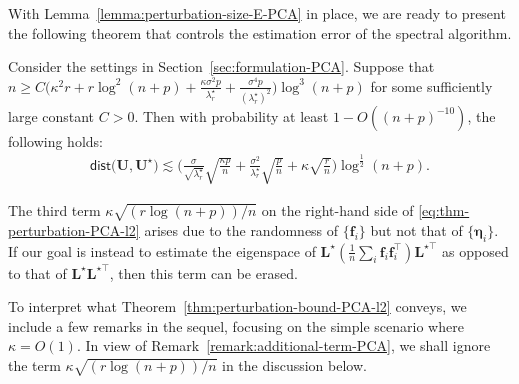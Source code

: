 With Lemma~\ref{lemma:perturbation-size-E-PCA} in place, we are ready to present the following theorem that controls the estimation error of the spectral algorithm.
%
\begin{theorem}
\label{thm:perturbation-bound-PCA-l2}
%
Consider the settings in Section~\ref{sec:formulation-PCA}.
Suppose that $n \geq C \big(\kappa^{2}r+ r\log^2(n+p)+ \frac{\kappa\sigma^{2}p}{\lambda_{r}^{\star}}+\frac{\sigma^{4}p}{(\lambda_{r}^{\star})^{2}}\big)\log^{3} (n+p)$ for some sufficiently large constant $C>0$.
Then with probability  at least $1-O((n+p)^{-10})$, the following holds:
%
\begin{align}
\mathsf{dist}\big(\bm{U},\bm{U}^{\star}\big)
	\lesssim\Bigg(\frac{\sigma}{\sqrt{\lambda_{r}^{\star}}}\sqrt{\frac{\kappa p}{n}}+\frac{\sigma^{2}}{\lambda_{r}^{\star}}\sqrt{\frac{p}{n}} + \kappa\sqrt{\frac{r}{n}}\Bigg)\log^{\frac{1}{2}}(n+p).
\label{eq:thm-perturbation-PCA-l2}
\end{align}
%
\end{theorem}
%
\begin{remark}
	\label{remark:additional-term-PCA}
	The third term $\kappa\sqrt{(r \log(n+p)) /n} $ on the right-hand side of \eqref{eq:thm-perturbation-PCA-l2} arises due to the randomness of $\{\bm{f}_i\}$ but not that of $\{\bm{\eta}_i\}$. If our goal is instead to estimate the eigenspace of $\bm{L}^{\star} (\frac{1}{n}\sum_i\bm{f}_i\bm{f}_i^{\top})\bm{L}^{\star\top}$ as opposed to that of $\bm{L}^{\star}\bm{L}^{\star\top}$, then this term can be erased.
\end{remark}
 


To interpret what Theorem~\ref{thm:perturbation-bound-PCA-l2} conveys,
we include a few remarks in the sequel, focusing on the simple scenario where $\kappa =O(1)$.
In view of Remark~\ref{remark:additional-term-PCA}, we shall ignore the term $\kappa\sqrt{(r \log(n+p)) /n} $ in the discussion below.


